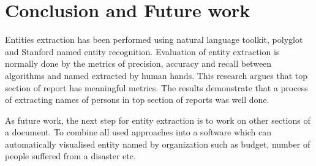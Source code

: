 \chapter{Conclusion and Future work}
Entities extraction has been performed using natural language toolkit, polyglot and Stanford named entity recognition.
Evaluation of entity extraction is normally done by the metrics of precision, accuracy and recall between algorithms and named extracted by human hands.  This research argues that top section of report has meaningful metrics. The results demonstrate that a process of extracting names of persons in top section of reports was well done.

As future work, the next step for entity extraction  is to work on other sections of a document.  To combine all used approaches into a software which can automatically visualised entity named by organization such as budget, number of people suffered from a disaster etc.